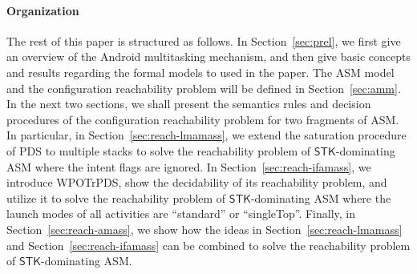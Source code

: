 \documentclass[preprint,12pt]{elsarticle}
\newcommand{\AMASS}{\textsf{ASM}}
\newcommand{\STK}{\mathsf{STK}}
\newcommand{\PDS}{\textsf{PDS}}
\newcommand{\WOTrPDS}{\textsf{WPOTrPDS}}
\begin{document}

\paragraph{Organization} The rest of this paper is structured as follows. In Section~\ref{sec:prel}, 
we first give an overview of the Android multitasking mechanism, and then give %
basic concepts and results regarding the formal models to used in the paper.  %
The {\AMASS} model and the configuration reachability problem will be defined in Section~\ref{sec:amm}.  %
In the next two sections, we shall present the semantics rules and decision procedures of the configuration reachability problem
for two fragments of %
{\AMASS}. In particular, in Section~\ref{sec:reach-lmamass}, we extend the saturation procedure of {\PDS} to multiple stacks to solve the reachability problem of $\STK$-dominating {\AMASS} where the intent flags are ignored. 
In Section~\ref{sec:reach-ifamass}, we introduce {\WOTrPDS}, show the decidability of its reachability problem, and utilize it to solve the reachability problem of $\STK$-dominating {\AMASS} where the launch modes of all activities are ``standard'' or ``singleTop''. Finally, in Section~\ref{sec:reach-amass}, we show how the ideas in Section~\ref{sec:reach-lmamass} and Section~\ref{sec:reach-ifamass} can be combined to solve the reachability problem of $\STK$-dominating {\AMASS}. 
\end{document}
